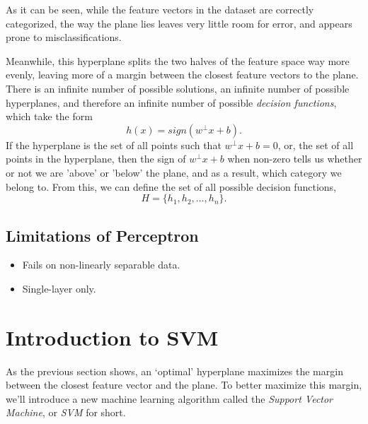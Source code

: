 As it can be seen, while the feature vectors in the dataset are correctly categorized, the way the plane lies leaves very little room for error, and appears prone to misclassifications.


Meanwhile, this hyperplane splits the two halves of the feature space way more evenly, leaving more of a margin between the closest feature vectors to the plane. There is an infinite number of possible solutions, an infinite number of possible hyperplanes, and therefore an infinite number of possible \textit{decision functions}, which take the form
\[
    h(x) = sign(w^\perp x+b).
\]
If the hyperplane is the set of all points such that $w^\perp x+b=0$, or, the set of all points in the hyperplane, then the sign of $w^\perp x+b$ when non-zero tells us whether or not we are 'above' or 'below' the plane, and as a result, which category we belong to. From this, we can define the set of all possible decision functions,
\[
    H = \{h_1, h_2, \dots, h_n\}.
\]

\subsection{Limitations of Perceptron}
\begin{itemize}
    \item Fails on non-linearly separable data.
    \item Single-layer only.
\end{itemize}

\section{Introduction to SVM}
As the previous section shows, an `optimal' hyperplane maximizes the margin between the closest feature vector and the plane. To better maximize this margin, we'll introduce a new machine learning algorithm called the \textit{Support Vector Machine}\cite{scholkopf2002learning}\cite{vapnik1998statistical}, or \textit{SVM} for short.

